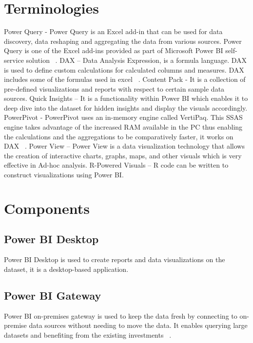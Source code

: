 \section{Terminologies}
Power Query - Power Query is an Excel add-in that can be used for data 
discovery, data reshaping and aggregating the data from various sources. 
Power Query is one of the Excel add-ins provided as part of Microsoft Power 
BI self-service solution ~\cite{hid-sp18-418-power bi-intro}.
DAX –  Data Analysis Expression, is a formula language. DAX is used to define 
custom calculations for calculated columns and measures. DAX includes some of 
the formulas used in excel ~\cite{hid-sp18-418-dax-basics}.
Content Pack -  It is a collection of pre-defined visualizations and reports 
with respect to certain sample data sources.
Quick Insights – It is a functionality within Power BI which enables it to 
deep dive into the dataset for hidden insights and display the 
visuals accordingly.
PowerPivot - PowerPivot uses an in-memory engine called VertiPaq. 
This SSAS engine takes advantage of the increased RAM available in the 
PC thus enabling the calculations and the aggregations to be comparatively 
faster, it works on DAX ~\cite{hid-sp18-418-power pivot}.
Power View – Power View is a data visualization technology that allows the 
creation of interactive charts, graphs, maps, and other visuals which is 
very effective in Ad-hoc analysis.
R-Powered Visuals – R code can be written to construct visualizations 
using Power BI.

\section{Components}

\subsection{Power BI Desktop}
Power BI Desktop is used to create reports and data visualizations on
the dataset, it is a desktop-based application.

\subsection{Power BI Gateway}
Power BI on-premises gateway is used to keep the data fresh 
by connecting to on-premise data sources without needing to move the data. It 
enables querying large datasets and benefiting from the existing investments
~\cite{hid-sp18-418-power bi-components}.

